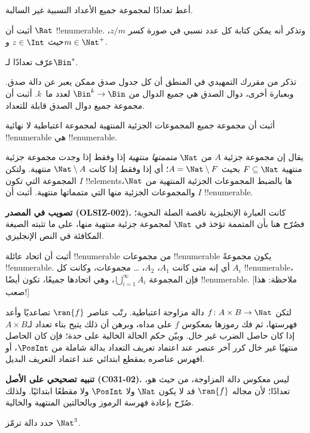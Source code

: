 \documentclass[../../../include/open-logic-section]{subfiles}
\begin{document}
\begin{prob}
أعط تعدادًا لمجموعة جميع الأعداد النسبية غير السالبة.
\end{prob}

\begin{prob}
أثبت أن $\Rat$ !!{enumerable}. وتذكر أنه يمكن كتابة كل عدد نسبي
في صورة كسر $z/m$، حيث $z \in \Int$ و$m \in \Nat^+$.
\end{prob}

\begin{prob}
عرّف تعدادًا لـ$\Bin^*$.
\end{prob}

\begin{prob}
تذكر من مقررك التمهيدي في المنطق أن كل جدول صدق ممكن يعبر عن دالة
صدق. وبعبارة أخرى، دوال الصدق هي جميع الدوال من $\Bin^k \to \Bin$
لعدد ما~$k$. أثبت أن مجموعة جميع دوال الصدق قابلة للتعداد.
\end{prob}

\begin{prob}
أثبت أن مجموعة جميع المجموعات الجزئية المنتهية لمجموعة اعتباطية لا
نهائية !!{enumerable} هي !!{enumerable}.
\end{prob}

\begin{prob}
يقال إن مجموعة جزئية $A$ من $\Nat$ \emph{متممتها منتهية} إذا وفقط إذا
وجدت مجموعة جزئية منتهية $F\subseteq\Nat$ بحيث
$A=\Nat\setminus F$؛ أي إذا وفقط إذا كانت $\Nat\setminus A$ منتهية.
ولتكن $I$ المجموعة
التي تكون !!{element}sها بالضبط المجموعات الجزئية المنتهية من
$\Nat$، والمجموعات الجزئية منها التي متمماتها منتهية. أثبت أن $I$
!!{enumerable}.
\end{prob}

\begin{editorial}
\textbf{تصويب في المصدر (OLSIZ-002).}
كانت العبارة الإنجليزية ناقصة الصلة النحوية؛ فصُرّح هنا بأن المتممة تؤخذ
في $\Nat$ لمجموعة جزئية منتهية منها، على ما تثبته الصيغة المكافئة في النص الإنجليزي.
\end{editorial}

\begin{prob}
أثبت أن اتحاد عائلة !!{enumerable} من مجموعات !!{enumerable} يكون
مجموعةً !!{enumerable}. أي إنه متى كانت $A_1$، $A_2$، \dots{} مجموعات،
وكانت كل $A_i$ !!{enumerable}، فإن المجموعة
$\bigcup_{i=1}^\infty
A_i$، وهي اتحادها جميعًا، تكون أيضًا !!{enumerable}. [ملاحظة: هذا صعب!]
\end{prob}

\begin{prob}
لتكن $f \colon A \times B \to \Nat$ دالة مزاوجة اعتباطية. رتّب عناصر
$\ran{f}$ تصاعديًا وأعد فهرستها، ثم فك رموزها بمعكوس $f$ على مداه، وبرهن
أن ذلك يتيح بناء تعداد لـ$A \times B$ إذا كان حاصل الضرب غير خال. وبيّن
حكم الحالة الخالية على حدة؛ فإن كان الحاصل منتهيًا غير خال كرر آخر عنصر
عند اعتماد تعريف التعداد بدالة شاملة من $\PosInt$، أو افهرس عناصره بمقطع
ابتدائي عند اعتماد التعريف البديل.
\end{prob}

\textbf{تنبيه تصحيحي على الأصل (C031-02).} ليس معكوس دالة المزاوجة، من حيث هو،
تعدادًا؛ لأن مجاله $\ran{f}$ قد لا يكون $\Nat$ ولا $\PosInt$ ولا مقطعًا
ابتدائيًا. ولذلك صُرّح بإعادة فهرسة الرموز وبالحالتين المنتهية والخالية.

\begin{prob}
حدد دالة ترمّز $\Nat^3$.
\end{prob}
\end{document}
